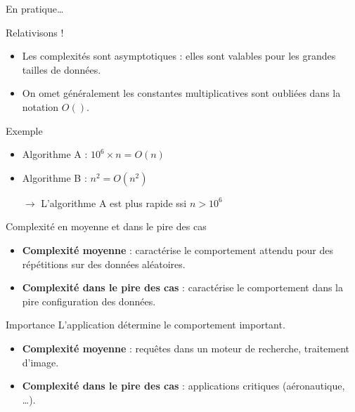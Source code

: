 \documentclass{beamer}
\begin{document}
\begin{frame}{En pratique\dots}
    \begin{block}{Relativisons !}
        \begin{itemize}
        \item Les complexités sont asymptotiques : elles sont valables pour les grandes tailles de données. 
        \item On omet généralement les constantes multiplicatives sont oubliées dans la notation $O()$.
        \end{itemize}
    \end{block}
    \begin{exampleblock}{Exemple}
        \begin{itemize}
            \item Algorithme A : $10^6\times{n} = O(n)$
            \item Algorithme B : $n^2 = O(n^2)$
            \item[$\rightarrow$] L'algorithme A est plus rapide ssi $n>10^6$
        \end{itemize}
    \end{exampleblock}
\end{frame}

\begin{frame}{Complexité en moyenne et dans le pire des cas}
    \begin{itemize}
        \item \textbf{Complexité moyenne} : caractérise le comportement attendu pour des répétitions sur des données aléatoires.
        \item \textbf{Complexité dans le pire des cas} : caractérise le comportement dans la pire configuration des données.
    \end{itemize}

\begin{exampleblock}{Importance}
L'application détermine le comportement important.
\begin{itemize}
\item \textbf{Complexité moyenne} : requêtes dans un moteur de recherche, traitement d'image.
\item \textbf{Complexité dans le pire des cas} :  applications critiques (aéronautique, \dots).
\end{itemize}
\end{exampleblock}

\end{frame}
\end{document}
